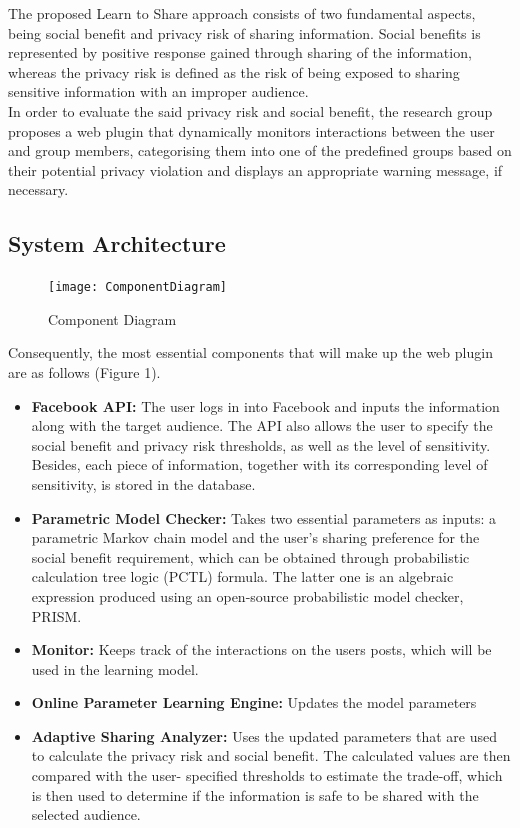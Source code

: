 \documentclass[a4paper,11pt]{article}
\begin{document}
The proposed Learn to Share approach consists of two fundamental aspects, being social benefit and privacy risk of sharing information. Social benefits is represented by positive response gained through sharing of the information, whereas the privacy risk is defined as the risk of being exposed to sharing sensitive information with an improper audience.\\
\indent In order to evaluate the said privacy risk and social benefit, the research group proposes a web plugin that dynamically monitors interactions between the user and group members, categorising them into one of the predefined groups based on their potential privacy violation and displays an appropriate warning message, if necessary. 

\subsection{System Architecture}

\begin{figure}[H]
	\centering
	\texttt{[image: ComponentDiagram]}
	\caption{Component Diagram}
\end{figure}

Consequently, the most essential components that will make up the web plugin are as follows (Figure 1). 
\begin{itemize}

\item \textbf{Facebook API:}  The user logs in into Facebook and inputs the information along with the target audience. The API also allows the user to specify the social benefit and privacy risk thresholds, as well as the level of sensitivity. Besides, each piece of information, together with its corresponding level of sensitivity, is stored in the database.

\item \textbf{Parametric Model Checker:} Takes two essential parameters as inputs: a parametric Markov chain model and the user's sharing preference for the social benefit requirement, which can be obtained through probabilistic calculation tree logic (PCTL) formula. The latter one is an algebraic expression produced using an open-source probabilistic model checker, PRISM.

\item \textbf{Monitor:} Keeps track of the interactions on the user\textquotesingle s posts, which will be used in the learning model.

\item \textbf{Online Parameter Learning Engine:} Updates the model parameters

\item \textbf{Adaptive Sharing Analyzer:} Uses the updated parameters that are used to calculate the privacy risk and social benefit. The calculated values are then compared with the user- specified thresholds to estimate the trade-off, which is then used to determine if the information is safe to be shared with the selected audience.

\end{itemize}
\end{document}
